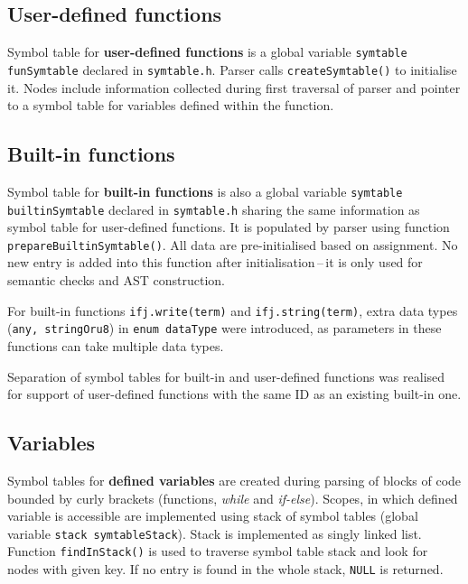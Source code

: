 \documentclass[a4paper, 11pt]{article}
\begin{document}
\subsection{User-defined functions}
Symbol table for \textbf{user-defined functions} is a global variable \verb|symtable funSymtable| declared in \newline\verb|symtable.h|. Parser calls
\verb|createSymtable()| to initialise it. Nodes include information collected during first traversal of parser and pointer 
to a symbol table for variables defined within the function.
\subsection{Built-in functions}
Symbol table for \textbf{built-in functions} is also a global variable \verb|symtable builtinSymtable| declared in \verb|symtable.h| sharing
the same information as symbol table for user-defined functions. It is populated by parser using function \verb|prepareBuiltinSymtable()|.
All data are pre-initialised based on assignment. No new entry is added into this function after initialisation\,--\,it is only used
for semantic checks and AST construction. 
\par For built-in functions \verb|ifj.write(term)| and \verb|ifj.string(term)|, extra
data types (\verb|any, stringOru8|) in \verb|enum dataType| were introduced, as parameters in these functions can take multiple data types. 
\par Separation of symbol tables for built-in and user-defined functions was realised for support of user-defined functions with the same ID as an existing built-in one.
\subsection{Variables}
Symbol tables for \textbf{defined variables} are created during parsing of blocks of code bounded by curly brackets (functions, \textit{while} and \textit{if-else}).
Scopes, in which defined variable is accessible are implemented using stack of symbol tables (global variable \verb|stack symtableStack|).
Stack is implemented as singly linked list. Function \verb|findInStack()| is used to traverse symbol table stack and look for nodes with given key.
If no entry is found in the whole stack, \verb|NULL| is returned.
\end{document}
